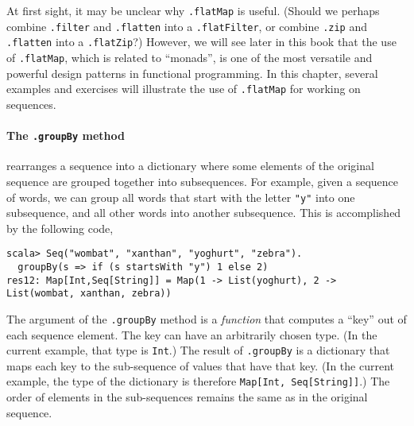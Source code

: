 At first sight, it may be unclear why \lstinline!.flatMap!
is useful. (Should we perhaps combine \lstinline!.filter!
and \lstinline!.flatten!
into a \lstinline!.flatFilter!,
or combine \lstinline!.zip!
and \lstinline!.flatten!
into a \lstinline!.flatZip!?)
However, we will see later in this book that the use of \lstinline!.flatMap!,
which is related to ``monads'', is one of the most
versatile and powerful design patterns in functional programming.
In this chapter, several examples and exercises will illustrate the
use of \lstinline!.flatMap!
for working on sequences.

\paragraph*{The \lstinline!.groupBy!
method}

rearranges a sequence into a dictionary where some elements of the
original sequence are grouped together into subsequences. For example,
given a sequence of words, we can group all words that start with
the letter \lstinline!"y"!
into one subsequence, and all other words into another subsequence.
This is accomplished by the following code,
\begin{lstlisting}
scala> Seq("wombat", "xanthan", "yoghurt", "zebra").
  groupBy(s => if (s startsWith "y") 1 else 2)
res12: Map[Int,Seq[String]] = Map(1 -> List(yoghurt), 2 -> List(wombat, xanthan, zebra))
\end{lstlisting}
The argument of the \lstinline!.groupBy!
method is a \emph{function} that computes a ``key'' out of each
sequence element. The key can have an arbitrarily chosen type. (In
the current example, that type is \lstinline!Int!.)
The result of \lstinline!.groupBy!
is a dictionary that maps each key to the sub-sequence of values that
have that key. (In the current example, the type of the dictionary
is therefore \lstinline!Map[Int, Seq[String]]!.)
The order of elements in the sub-sequences remains the same as in
the original sequence.

